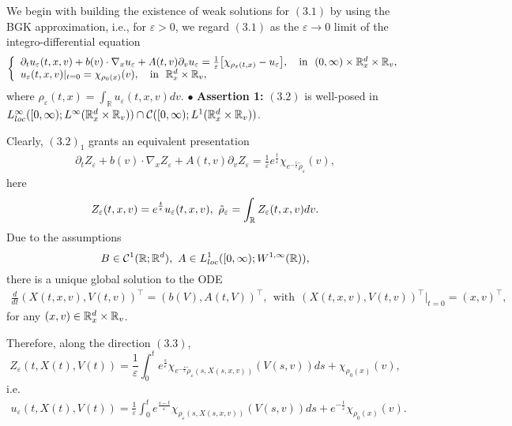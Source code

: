 \documentclass[11pt]{article}
\begin{document}
 \vskip1mm\par
We begin with building the existence of weak solutions for $(3.1)$
by using the BGK approximation, i.e., for $\varepsilon>0$, we regard
$(3.1)$ as the $\varepsilon\rightarrow 0$ limit of the
integro-differential equation
\begin{eqnarray}\label{3.2}
\left\{\begin{array}{ll} \partial_
tu_\varepsilon(t,x,v)+b(v)\cdot\nabla_xu_\varepsilon+A(t,v)
\partial_vu_\varepsilon= \frac{1}{\varepsilon}
{\big[} \chi_{\rho_\varepsilon(t,x)} -u_\varepsilon{\big]}, \ \ \
\mbox{in} \ \ (0,\infty)\times{\mathbb R}^d_x\times {\mathbb R}_v, \\
u_\varepsilon(t,x,v)|_{t=0}=\chi_{\rho_0(x)}(v), \ \ \ \mbox{in} \ \
{\mathbb R}^d_x\times {\mathbb R}_v,
\end{array}
\right.
\end{eqnarray}
where $\rho_\varepsilon(t,x)=\int_{\mathbb
R}u_\varepsilon(t,x,v)dv.$
  \vskip2mm\noindent
$\bullet$ \textbf{Assertion 1:} $(3.2)$ is well-posed in $
L^\infty_{loc}([0,\infty);L^\infty({\mathbb R}^d_x\times{\mathbb R}_v))\cap
{\mathcal C}([0,\infty);L^1({\mathbb R}^d_x\times{\mathbb R}_v))$.
 \vskip2mm\par
Clearly, $(3.2)_1$ grants an equivalent presentation
\begin{eqnarray*}
\partial_tZ_\varepsilon+b(v)\cdot\nabla_xZ_\varepsilon+A(t,v)
\partial_vZ_\varepsilon=
\frac{1}{\varepsilon}e^{\frac{t}{\varepsilon}}
\chi_{e^{-\frac{t}{\varepsilon}}\tilde{\rho}_\varepsilon}(v),
\end{eqnarray*}
here
$$
Z_\varepsilon(t,x,v)=e^{\frac{t}{\varepsilon}}u_\varepsilon(t,x,v),
\ \tilde{\rho}_\varepsilon=\int_{{\mathbb R}}Z_\varepsilon(t,x,v)dv.
$$
Due to the assumptions
$$
B\in {\mathcal C}^1({\mathbb R};{\mathbb R}^d), \ A\in
L^1_{loc}([0,\infty);W^{1,\infty}({\mathbb R})),
$$
there is a unique global solution to the ODE
\begin{eqnarray}\label{3.3}
\frac{d}{dt}(X(t,x,v), V(t,v))^\top=(b(V),  A(t,V))^\top,  \ \
\mbox{with} \ \ (X(t,x,v), V(t,v))^\top|_{t=0}=(x,v)^\top,
\end{eqnarray}
for any $(x,v)\in {\mathbb R}^d_x\times{\mathbb R}_v$.
 \vskip1mm\par
Therefore, along the direction $(3.3)$,
$$
Z_\varepsilon(t,X(t),V(t))=\frac{1}{\varepsilon}\int^t_0e^{\frac{s}
{\varepsilon}}\chi_{e^{-\frac{s}{\varepsilon}}\tilde{\rho}_\varepsilon(s,X(s,x,v))}
(V(s,v))ds+ \chi_{\rho_0(x)}(v),
$$
i.e.
\begin{eqnarray*}
u_\varepsilon(t,X(t),V(t))=\frac{1}{\varepsilon}\int^t_0e^{\frac{s-t}{\varepsilon}}
\chi_{\rho_\varepsilon(s,X(s,x,v))}(V(s,v))ds+
e^{-\frac{t}{\varepsilon}}\chi_{\rho_0(x)}(v).
\end{eqnarray*}
\end{document}
